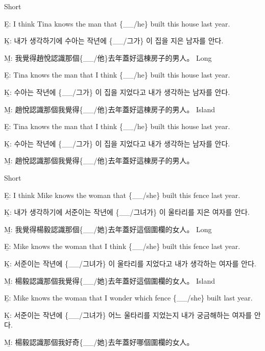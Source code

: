 \pex %
\a Short\par\nobreak
\beginsubsub
\b{E:} I think Tina knows the man that \{\_\_/he\} built this house last year.\par\nobreak
\b{K:} \ko 내가 생각하기에 수아는 작년에 \{\_\_/그가\} 이 집을 지은 남자를 안다. \normalfont\par\nobreak
\b{M:} \zh 我覺得趙悅認識那個\{\_\_/他\}去年蓋好這棟房子的男人。 \normalfont
\endsubsub
\a Long\par\nobreak
\beginsubsub
\b{E:} Tina knows the man that I think \{\_\_/he\} built this house last year.\par\nobreak
\b{K:} \ko 수아는 작년에 \{\_\_/그가\} 이 집을 지었다고 내가 생각하는 남자를 안다. \normalfont\par\nobreak
\b{M:} \zh 趙悅認識那個我覺得\{\_\_/他\}去年蓋好這棟房子的男人。 \normalfont
\endsubsub
\a Island\par\nobreak
\beginsubsub
\b{E:} Tina knows the man that I think \{\_\_/he\} built this house last year.\par\nobreak
\b{K:} \ko 수아는 작년에 \{\_\_/그가\} 이 집을 지었다고 내가 생각하는 남자를 안다\normalfont.\par\nobreak
\b{M:} \zh 趙悅認識那個我覺得\{\_\_/他\}去年蓋好這棟房子的男人。\normalfont
\endsubsub
\xe

\pex %
\a Short\par\nobreak
\beginsubsub
\b{E:} I think Mike knows the woman that \{\_\_/she\} built this fence last year.\par\nobreak
\b{K:} \ko 내가 생각하기에 서준이는 작년에 \{\_\_/그녀가\} 이 울타리를 지은 여자를 안다. \normalfont\par\nobreak
\b{M:} \zh 我覺得楊毅認識那個\{\_\_/她\}去年蓋好這個圍欄的女人。 \normalfont
\endsubsub
\a Long\par\nobreak
\beginsubsub
\b{E:} Mike knows the woman that I think \{\_\_/she\} built this fence last year.\par\nobreak
\b{K:} \ko 서준이는 작년에 \{\_\_/그녀가\} 이 울타리를 지었다고 내가 생각하는 여자를 안다. \normalfont\par\nobreak
\b{M:} \zh 楊毅認識那個我覺得\{\_\_/她\}去年蓋好這個圍欄的女人。 \normalfont
\endsubsub
\a Island\par\nobreak
\beginsubsub
\b{E:} Mike knows the woman that I wonder which fence \{\_\_/she\} built last year.\par\nobreak
\b{K:} \ko 서준이는 작년에 \{\_\_/그녀가\} 어느 울타리를 지었는지 내가 궁금해하는 여자를 안다\normalfont.\par\nobreak
\b{M:} \zh 楊毅認識那個我好奇\{\_\_/她\}去年蓋好哪個圍欄的女人。\normalfont
\endsubsub
\xe

